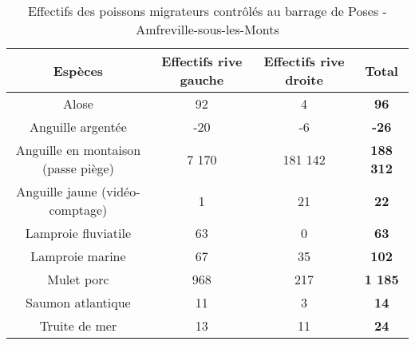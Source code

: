 \begin{table}[H]
\centering
\caption{Effectifs des poissons migrateurs contrôlés au barrage de Poses - Amfreville-sous-les-Monts} 
\label{recap}
\begin{tabular}{cccc}
  \hline
Espèces & Effectifs rive gauche & Effectifs rive droite & Total \\ 
  \hline
Alose &    92 &       4 & {\textbf{     96}} \\ 
  Anguille argentée &   -20 &      -6 & {\textbf{    -26}} \\ 
  Anguille en montaison (passe piège) & 7 170 & 181 142 & {\textbf{188 312}} \\ 
  Anguille jaune (vidéo-comptage) &     1 &      21 & {\textbf{     22}} \\ 
  Lamproie fluviatile &    63 &       0 & {\textbf{     63}} \\ 
  Lamproie marine &    67 &      35 & {\textbf{    102}} \\ 
  Mulet porc &   968 &     217 & {\textbf{  1 185}} \\ 
  Saumon atlantique &    11 &       3 & {\textbf{     14}} \\ 
  Truite de mer &    13 &      11 & {\textbf{     24}} \\ 
   \hline
\end{tabular}
\end{table}
